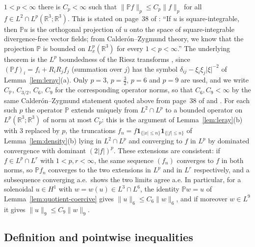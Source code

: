 \documentclass[11pt]{article}
\theoremstyle{definition}
\theoremstyle{plain}
\newcommand{\R}{\mathbb R}
\newcommand{\norm}[1]{\lVert #1\rVert}
\begin{document}
\begin{itemize}
 $1<p<\infty$ there is $C_p<\infty$ such that
 $\norm{\mathbb Pf}_p\le C_p\norm f_p$ for all
 $f\in L^2\cap L^p(\R^3;\R^3)$.  This is stated on page~38 of
 \cite{Tao2013}: ``If $u$ is square-integrable, then $\mathbb Pu$ is the
 orthogonal projection of $u$ onto the space of square-integrable
 divergence-free vector fields; from Calder\'on--Zygmund theory, we know
 that the projection $\mathbb P$ is bounded on $L^p_x(\R^3)$ for every
 $1<p<\infty$.''  The underlying theorem is the $L^p$ boundedness of the
 Riesz transforms \cite[Ch.~II, \S2; Ch.~III, \S1]{Stein1970}, since
 $(\mathbb Pf)_i=f_i+R_iR_jf_j$ (summation over $j$) has the symbol
 $\delta_{ij}-\xi_i\xi_j|\xi|^{-2}$ of Lemma~\ref{lem:leray}(a).  Only $p=3$, $p=\frac32$, $p=6$ and $p=9$ are used, and we write
$C_{\mathbb P}$, $C_{3/2}$, $C_6$, $C_9$ for the corresponding operator
norms, so that $C_6,C_9<\infty$ by the same Calder\'on--Zygmund statement
quoted above from page~38 of \cite{Tao2013} and
\cite[Ch.~II, \S2; Ch.~III, \S1]{Stein1970}.  For each such $p$ the
operator $\mathbb P$ extends uniquely from $L^2\cap L^p$ to a bounded
operator on $L^p(\R^3;\R^3)$ of norm at most $C_p$: this is the argument
of Lemma~\ref{lem:leray}(b) with $3$ replaced by $p$, the truncations
$f_n=f\mathbf1_{\{|x|\le n\}}\mathbf1_{\{|f|\le n\}}$ of
Lemma~\ref{lem:density}(b) lying in $L^2\cap L^p$ and converging to $f$ in
$L^p$ by dominated convergence with dominant $(2|f|)^p$.  These extensions
are consistent: if $f\in L^p\cap L^r$ with $1<p,r<\infty$, the same
sequence $(f_n)$ converges to $f$ in both norms, so $\mathbb Pf_n$
converges to the two extensions in $L^p$ and in $L^r$ respectively, and a
subsequence converging a.e.\ shows the two limits agree a.e.  In
particular, for a solenoidal $u\in H^1$ with $w=w(u)\in L^3\cap L^6$, the
identity $\mathbb Pw=u$ of Lemma~\ref{lem:quotient-coercive} gives
$\norm u_6\le C_6\norm w_6$, and if moreover $w\in L^9$ it gives
$\norm u_9\le C_9\norm w_9$.
\end{itemize}

\subsection{Definition and pointwise inequalities}
\end{document}
